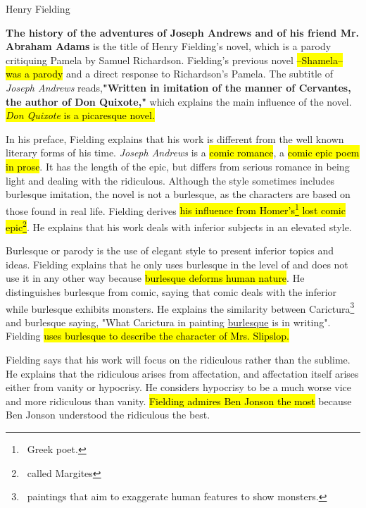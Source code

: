 \documentclass[12pt, a4paper]{article}
\begin{document}

\enlargethispage{\baselineskip}
\titlehead{Joseph Andrews}{Henry Fielding}



\ind \textbf{The history of the adventures of Joseph Andrews and of his friend Mr. Abraham Adams} is the 
title of Henry Fielding's novel, which is a parody critiquing Pamela by Samuel Richardson.
Fielding's previous novel \hl{--Shamela-- was a parody} and a direct response to Richardson's Pamela.
The subtitle of \textit{Joseph Andrews} reads,\textbf{"Written in imitation of the manner of Cervantes,
  the author of Don Quixote,"} which explains the main influence of the novel. \hl{\textit{Don Quixote} is a picaresque
novel.} 


\ind In his preface, Fielding explains that his work is different from the well known
literary forms of his time. \textit{Joseph Andrews} is a \hl{comic romance}, a \hl{comic epic
poem in prose}. It has the length of the epic, but differs from serious romance
in being light and dealing with the ridiculous. Although the style sometimes 
includes burlesque  imitation, the novel is not a burlesque, as the characters are
based on those found in real life. Fielding derives \hl{his influence from Homer's\footnote{
\, Greek poet.} lost comic epic\footnote{\, called Margites}}. He explains that his work deals with inferior subjects
in an elevated style.


\ind Burlesque or parody is the use of elegant style to present inferior topics and ideas. 
Fielding explains that he only uses burlesque in the level of 
and does not use it in any other way because \hl{burlesque deforms human nature}. He 
distinguishes burlesque from comic, saying that comic deals with the inferior while
burlesque exhibits monsters. He
explains the similarity between Carictura\footnote{\, paintings that aim to
exaggerate human features to show monsters.} and burlesque saying,
"What Carictura in painting \underline{burlesque} is in writing". Fielding \hl{uses
burlesque to describe the character of Mrs. Slipslop.}



\ind Fielding says that his work will focus on the ridiculous rather than the sublime.
He explains that the ridiculous arises from affectation, and 
affectation itself arises either from vanity or hypocrisy.
He considers hypocrisy to be a much worse vice and more ridiculous than vanity.
\hl{Fielding admires Ben Jonson the most} because Ben Jonson understood the ridiculous the best.
\end{document}
